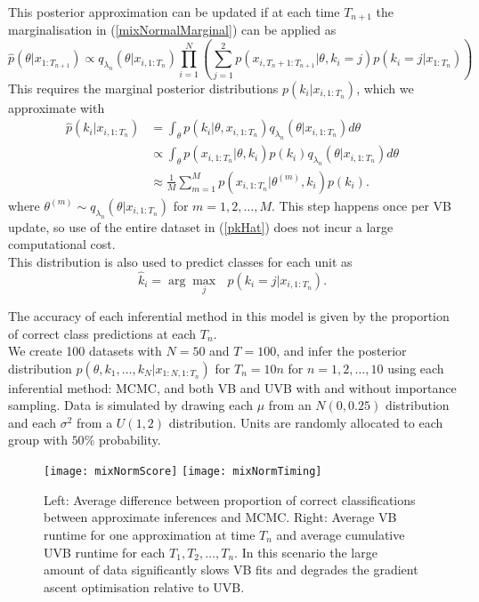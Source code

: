 \documentclass[12pt,a4paper]{article}\usepackage[]{graphicx}\usepackage[]{color}
\begin{document}
This posterior approximation can be updated if at each time $T_{n+1}$ the marginalisation in (\ref{mixNormalMarginal}) can be applied as
\begin{equation}
\label{mixNormalUpdate}
\hat{p}(\theta | x_{1:T_{n+1}}) \propto q_{\lambda_{n}}(\theta | x_{i, 1:T_{n}}) \prod_{i=1}^N \left( \sum_{j=1}^2 p(x_{i, T_n+1:T_{n+1}} | \theta, k_i = j) p(k_i = j | x_{1:T_n}) \right)
\end{equation}
This requires the marginal posterior distributions $p(k_i | x_{i, 1:T_{n}})$, which we approximate with
\begin{align}
\hat{p}(k_i | x_{i, 1:T_{n}}) &= \int_{\theta} p(k_i | \theta, x_{i, 1:T_{n}})q_{\lambda_{n}}(\theta | x_{i, 1:T_{n}}) d\theta \nonumber \\
&\propto \int_{\theta} p(x_{i, 1:T_n} | \theta, k_i) p(k_i) q_{\lambda_{n}}(\theta | x_{i, 1:T_{n}}) d\theta \nonumber \\
&\approx \frac{1}{M} \sum_{m=1}^M p(x_{i, 1:T_n} | \theta^{(m)} , k_i) p(k_i). \label{pkHat}
\end{align}
where $\theta^{(m)} \sim q_{\lambda_{n}}(\theta | x_{i, 1:T_{n}})$ for $m = 1, 2, \dots, M$. This step happens once per VB update, so use of the entire dataset in (\ref{pkHat}) does not incur a large computational cost.
\\

This distribution is also used to predict classes for each unit as
\begin{equation}
\hat{k}_i = \arg \underset{j}{\max}\mbox{ } p(k_i = j | x_{i, 1:T_n}).
\end{equation}

The accuracy of each inferential method in this model is given by the proportion of correct class predictions at each $T_n$.
\\

We create 100 datasets with $N = 50$ and $T = 100$, and infer the posterior distribution $p(\theta, k_1, \dots, k_N | x_{1:N, 1:T_n})$ for $T_n = 10n$ for $n = 1, 2, \dots, 10$ using each inferential method: MCMC, and both VB and UVB with and without importance sampling. Data is simulated by drawing each $\mu$ from an $N(0, 0.25)$ distribution and each $\sigma^2$ from a $U(1, 2)$ distribution. Units are randomly allocated to each group with $50\%$ probability.

\begin{figure}%
    \centering
    {{\texttt{[image: mixNormScore]} }}%
    \qquad
    {{\texttt{[image: mixNormTiming]} }}%
    \caption{Left: Average difference between proportion of correct classifications between approximate inferences and MCMC. Right: Average VB runtime for one approximation at time $T_n$ and average cumulative UVB runtime for each $T_1, T_2, \dots, T_n$. In this scenario the large amount of data significantly slows VB fits and degrades the gradient ascent optimisation relative to UVB.}%
    \label{fig:mixnormResults}%
\end{figure}
\end{document}
